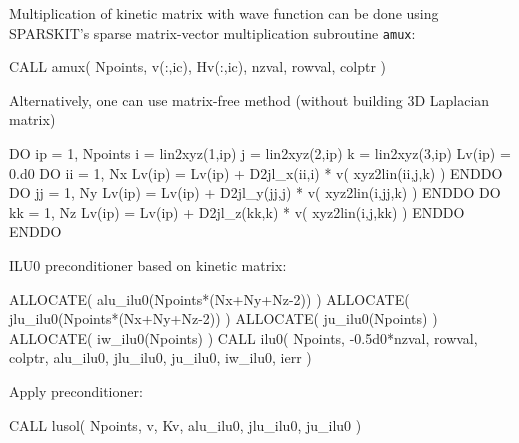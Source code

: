 Multiplication of kinetic matrix with wave function can be done using
SPARSKIT's sparse matrix-vector multiplication subroutine {\tt amux}:
\begin{fortrancode}
CALL amux( Npoints, v(:,ic), Hv(:,ic), nzval, rowval, colptr )
\end{fortrancode}

Alternatively, one can use matrix-free method (without building
3D Laplacian matrix)
\begin{fortrancode}
DO ip = 1, Npoints
  i = lin2xyz(1,ip)
  j = lin2xyz(2,ip)
  k = lin2xyz(3,ip)
  Lv(ip) = 0.d0
  DO ii = 1, Nx
    Lv(ip) = Lv(ip) + D2jl_x(ii,i) * v( xyz2lin(ii,j,k) )
  ENDDO
  DO jj = 1, Ny
    Lv(ip) = Lv(ip) + D2jl_y(jj,j) * v( xyz2lin(i,jj,k) )
  ENDDO
  DO kk = 1, Nz
    Lv(ip) = Lv(ip) + D2jl_z(kk,k) * v( xyz2lin(i,j,kk) )
  ENDDO
ENDDO
\end{fortrancode}

ILU0 preconditioner based on kinetic matrix:
\begin{fortrancode}
ALLOCATE( alu_ilu0(Npoints*(Nx+Ny+Nz-2)) )
ALLOCATE( jlu_ilu0(Npoints*(Nx+Ny+Nz-2)) )
ALLOCATE( ju_ilu0(Npoints) )
ALLOCATE( iw_ilu0(Npoints) )
CALL ilu0( Npoints, -0.5d0*nzval, rowval, colptr, alu_ilu0, jlu_ilu0, ju_ilu0, iw_ilu0, ierr )
\end{fortrancode}

Apply preconditioner:
\begin{fortrancode}
CALL lusol( Npoints, v, Kv, alu_ilu0, jlu_ilu0, ju_ilu0 )
\end{fortrancode}


